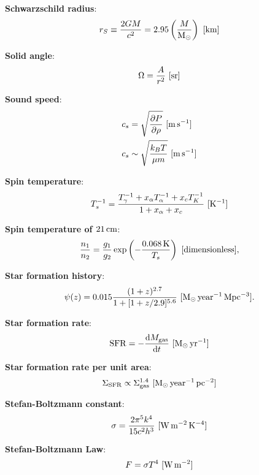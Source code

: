 \documentclass[a4paper,11pt]{article}
\begin{document}
{\noindent}\textbf{Schwarzschild radius}:
\begin{align*}
    r_S \equiv \frac{2GM}{c^2} = 2.95\left(\frac{M}{{\rm M_\odot}}\right) ~ [{\rm km}]
\end{align*}

{\noindent}\textbf{Solid angle}:
\begin{align*}
    \Omega = \frac{A}{r^2} ~ [{\rm sr}]
\end{align*}

{\noindent}\textbf{Sound speed}:
\begin{align*}
    c_s &= \sqrt{\frac{\partial P}{\partial\rho}} ~ [{\rm m\,s^{-1}}] \\
    c_s &\sim \sqrt{\frac{k_BT}{\mu m}} ~ [{\rm m\,s^{-1}}]
\end{align*}

{\noindent}\textbf{Spin temperature}:
\begin{align*}
    T_s^{-1} = \frac{T_\gamma^{-1} + x_\alpha T_\alpha^{-1} + x_cT_K^{-1}}{1+x_\alpha+x_c} ~ [{\rm K^{-1}}]
\end{align*}

{\noindent}\textbf{Spin temperature of $21\,{\rm cm}$}:
\begin{align*}
    \frac{n_1}{n_2} = \frac{g_1}{g_2}\exp\left(-\frac{0.068\,{\rm K}}{T_s}\right) ~ [{\rm dimensionless}],
\end{align*}

{\noindent}\textbf{Star formation history}:
\begin{align*}
    \psi(z) = 0.015\frac{(1+z)^{2.7}}{1+[1+z/2.9]^{5.6}} ~ [{\rm M_\odot\,year^{-1}\,Mpc^{-3}}].
\end{align*}

{\noindent}\textbf{Star formation rate}:
\begin{align*}
    \mathrm{SFR} = -\frac{\mathrm{d}M_\mathrm{gas}}{\mathrm{d}t} ~ [{\rm M_\odot\,yr^{-1}}]
\end{align*}

{\noindent}\textbf{Star formation rate per unit area}:
\begin{align*}
    \Sigma_\mathrm{SFR} \propto \Sigma_\mathrm{gas}^{1.4} ~ [{\rm M_\odot\,year^{-1}\,pc^{-2}}]
\end{align*}

{\noindent}\textbf{Stefan-Boltzmann constant}:
\begin{align*}
    \sigma = \frac{2\pi^5k^4}{15c^2h^3} ~ [{\rm W\,m^{-2}\,K^{-4}}]
\end{align*}

{\noindent}\textbf{Stefan-Boltzmann Law}:
\begin{align*}
    F = \sigma T^4 ~ [{\rm W\,m^{-2}}]
\end{align*}
\end{document}
